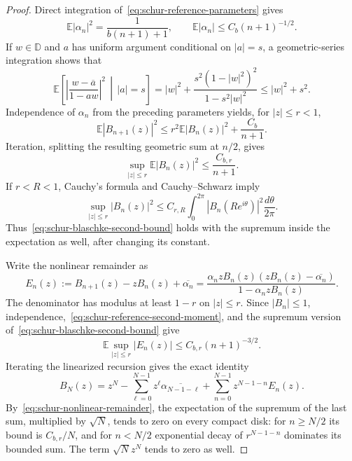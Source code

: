 \documentclass[11pt,a4paper]{article}
\numberwithin{equation}{section}
\theoremstyle{definition}
\theoremstyle{remark}
\begin{document}
\begin{proof}
Direct integration of~\eqref{eq:schur-reference-parameters} gives
\begin{equation}
 \mathbb E|\alpha_n|^2=\frac{1}{b(n+1)+1},\qquad
 \mathbb E|\alpha_n|\le C_b(n+1)^{-1/2}.
 \label{eq:schur-reference-second-moment}
\end{equation}
If $w\in\mathbb D$ and $a$ has uniform argument conditional on
$|a|=s$, a geometric-series integration shows that
\[
 \mathbb E\left[\left|\frac{w-\overline a}{1-aw}\right|^2
                   \,\middle|\,|a|=s\right]
 =|w|^2+\frac{s^2(1-|w|^2)^2}{1-s^2|w|^2}
 \le |w|^2+s^2.
\]
Independence of $\alpha_n$ from the preceding parameters yields, for
$|z|\le r<1$,
\[
 \mathbb E|B_{n+1}(z)|^2
 \le r^2\mathbb E|B_n(z)|^2+\frac{C_b}{n+1}.
\]
Iteration, splitting the resulting geometric sum at $n/2$, gives
\begin{equation}
 \sup_{|z|\le r}\mathbb E|B_n(z)|^2
 \le\frac{C_{b,r}}{n+1}.
 \label{eq:schur-blaschke-second-bound}
\end{equation}
If $r<R<1$, Cauchy's formula and Cauchy--Schwarz imply
\[
 \sup_{|z|\le r}|B_n(z)|^2
 \le C_{r,R}\int_0^{2\pi}|B_n(Re^{i\theta})|^2
                              \frac{d\theta}{2\pi}.
\]
Thus~\eqref{eq:schur-blaschke-second-bound} holds with the supremum
inside the expectation as well, after changing its constant.

Write the nonlinear remainder as
\[
 E_n(z):=B_{n+1}(z)-zB_n(z)+\overline{\alpha_n}
 =\frac{\alpha_nzB_n(z)
               (zB_n(z)-\overline{\alpha_n})}
              {1-\alpha_nzB_n(z)}.
\]
The denominator has modulus at least $1-r$ on $|z|\le r$. Since
$|B_n|\le1$, independence,~\eqref{eq:schur-reference-second-moment},
and the supremum version of~\eqref{eq:schur-blaschke-second-bound}
give
\begin{equation}
 \mathbb E\sup_{|z|\le r}|E_n(z)|
 \le C_{b,r}(n+1)^{-3/2}.
 \label{eq:schur-nonlinear-remainder}
\end{equation}
Iterating the linearized recursion gives the exact identity
\[
 B_N(z)=z^N-\sum_{\ell=0}^{N-1}
       z^\ell\overline{\alpha_{N-1-\ell}}
       +\sum_{n=0}^{N-1}z^{N-1-n}E_n(z).
\]
By~\eqref{eq:schur-nonlinear-remainder}, the expectation of the
supremum of the last sum, multiplied by $\sqrt N$, tends to zero on
every compact disk: for $n\ge N/2$ its bound is $C_{b,r}/N$, and
for $n<N/2$ exponential decay of $r^{N-1-n}$ dominates its bounded
sum. The term $\sqrt Nz^N$ tends to zero as well.


\end{proof}
\end{document}
